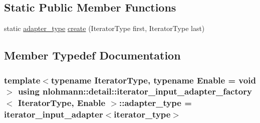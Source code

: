 \subsection*{Static Public Member Functions}
\begin{DoxyCompactItemize}
\item 
static \hyperlink{structnlohmann_1_1detail_1_1iterator__input__adapter__factory_a264935c57ca29dfb5153ade55266d1fa}{adapter\+\_\+type} \hyperlink{structnlohmann_1_1detail_1_1iterator__input__adapter__factory_a1d3a80249cf837448966319310be9ec4}{create} (Iterator\+Type first, Iterator\+Type last)
\end{DoxyCompactItemize}


\subsection{Member Typedef Documentation}
\subsubsection[{\texorpdfstring{adapter\+\_\+type}{adapter_type}}]{\setlength{\rightskip}{0pt plus 5cm}template$<$typename Iterator\+Type, typename Enable = void$>$ using {\bf nlohmann\+::detail\+::iterator\+\_\+input\+\_\+adapter\+\_\+factory}$<$ Iterator\+Type, Enable $>$\+::{\bf adapter\+\_\+type} =  {\bf iterator\+\_\+input\+\_\+adapter}$<${\bf iterator\+\_\+type}$>$}\hypertarget{structnlohmann_1_1detail_1_1iterator__input__adapter__factory_a264935c57ca29dfb5153ade55266d1fa}{}\label{structnlohmann_1_1detail_1_1iterator__input__adapter__factory_a264935c57ca29dfb5153ade55266d1fa}
